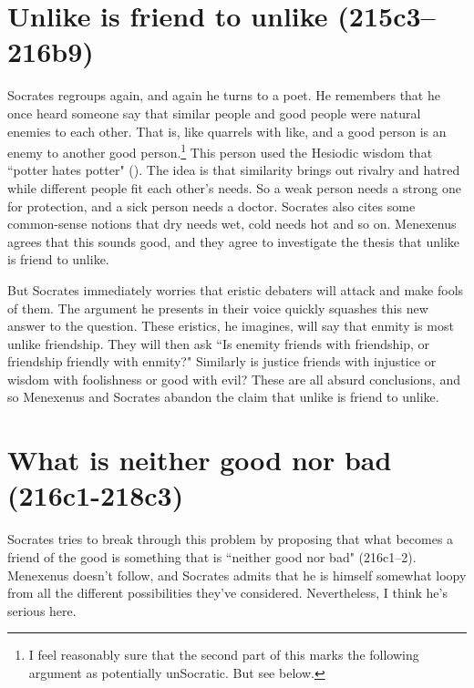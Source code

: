 \documentclass[11pt]{article}
\begin{document}

\section{Unlike is friend to unlike (215c3--216b9)}

Socrates regroups again, and again he turns to a poet.  He remembers that he
once heard someone say that similar people and good people were natural enemies
to each other.  That is, like quarrels with like, and a good person is an enemy
to another good person.\footnote{I feel reasonably sure that the second part of
this marks the following argument as potentially unSocratic.  But see below.}
This person used the Hesiodic wisdom that ``potter hates potter" ().  The idea is that similarity brings out rivalry and hatred while
different people fit each other's needs.  So a weak person needs a strong one
for protection, and a sick person needs a doctor.  Socrates also cites some
common-sense notions that dry needs wet, cold needs hot and so on.  Menexenus
agrees that this sounds good, and they agree to investigate the thesis that
unlike is friend to unlike.

But Socrates immediately worries that eristic debaters will attack and make
fools of them.  The argument he presents in their voice quickly squashes this
new answer to the question.  These eristics, he imagines, will say that enmity
is most unlike friendship.  They will then ask ``Is enemity friends with
friendship, or friendship friendly with enmity?"  Similarly is justice friends
with injustice or wisdom with foolishness or good with evil?  These are all
absurd conclusions, and so Menexenus and Socrates abandon the claim that unlike
is friend to unlike.


\section{What is neither good nor bad (216c1-218c3)}

Socrates tries to break through this problem by proposing that what becomes
a friend of the good is something that is ``neither good nor bad" (216c1--2).
Menexenus doesn't follow, and Socrates admits that he is himself somewhat loopy
from all the different possibilities they've considered.  Nevertheless, I think
he's serious here.
\end{document}
